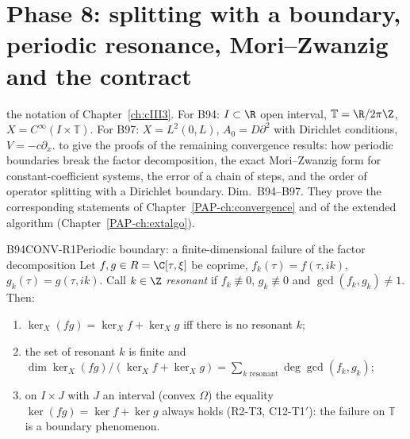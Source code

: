 \chapter[Convergence: splitting, resonance, contract]{Phase 8: splitting with a boundary, periodic resonance, Mori--Zwanzig and the contract}\label{ch:cIV7}
\chapterbrief
{the notation of Chapter~\ref{ch:cIII3}. For B94: $I\subset\R$ open interval, $\mathbb T=\R/2\pi\Z$, $X=C^\infty(I\times\mathbb T)$. For B97: $X=L^2(0,L)$, $A_0=D\partial^2$ with Dirichlet conditions, $V=-c\partial_x$.}
{to give the proofs of the remaining convergence results: how periodic boundaries break the factor decomposition, the exact Mori--Zwanzig form for constant-coefficient systems, the error of a chain of steps, and the order of operator splitting with a Dirichlet boundary.}
{Dim.~B94--B97. They prove the corresponding statements of Chapter~\ref{PAP-ch:convergence} and of the extended algorithm (Chapter~\ref{PAP-ch:extalgo}).}

\begin{dimcard}{B94}{CONV-R1}{Periodic boundary: a finite-dimensional failure of the factor decomposition}{\proved}{}
Let $f,g\in R=\C[\tau,\xi]$ be coprime, $f_k(\tau)=f(\tau,ik)$, $g_k(\tau)=g(\tau,ik)$. Call $k\in\Z$ \emph{resonant} if $f_k\not\equiv0$, $g_k\not\equiv0$ and $\gcd(f_k,g_k)\ne1$. Then:
\begin{enumerate}[label=(\alph*)]
\item $\ker_X(fg)=\ker_Xf+\ker_Xg$ iff there is no resonant $k$;
\item the set of resonant $k$ is finite and $\dim\ker_X(fg)/(\ker_Xf+\ker_Xg)=\sum_{k\text{ resonant}}\deg\gcd(f_k,g_k)$;
\item on $I\times J$ with $J$ an interval (convex $\Omega$) the equality $\ker(fg)=\ker f+\ker g$ always holds (R2-T3, C12-T1$'$): the failure on $\mathbb T$ is a boundary phenomenon.
\end{enumerate}
\end{dimcard}

